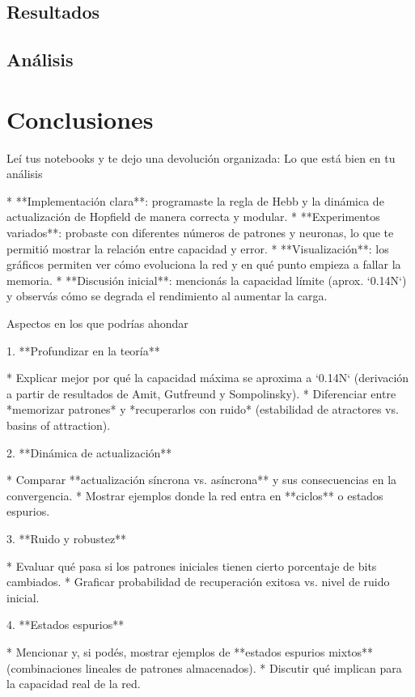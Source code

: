 \documentclass[11pt]{article} %
\begin{document}
\subsection{Resultados}

\subsection{Análisis}

\section{Conclusiones}

Leí tus notebooks y te dejo una devolución organizada:
Lo que está bien en tu análisis

* **Implementación clara**: programaste la regla de Hebb y la dinámica de actualización de Hopfield de manera correcta y modular.
* **Experimentos variados**: probaste con diferentes números de patrones y neuronas, lo que te permitió mostrar la relación entre capacidad y error.
* **Visualización**: los gráficos permiten ver cómo evoluciona la red y en qué punto empieza a fallar la memoria.
* **Discusión inicial**: mencionás la capacidad límite (aprox. `0.14N`) y observás cómo se degrada el rendimiento al aumentar la carga.

Aspectos en los que podrías ahondar

1. **Profundizar en la teoría**

   * Explicar mejor por qué la capacidad máxima se aproxima a `0.14N` (derivación a partir de resultados de Amit, Gutfreund y Sompolinsky).
   * Diferenciar entre *memorizar patrones* y *recuperarlos con ruido* (estabilidad de atractores vs. basins of attraction).

2. **Dinámica de actualización**

   * Comparar **actualización síncrona vs. asíncrona** y sus consecuencias en la convergencia.
   * Mostrar ejemplos donde la red entra en **ciclos** o estados espurios.

3. **Ruido y robustez**

   * Evaluar qué pasa si los patrones iniciales tienen cierto porcentaje de bits cambiados.
   * Graficar probabilidad de recuperación exitosa vs. nivel de ruido inicial.

4. **Estados espurios**

   * Mencionar y, si podés, mostrar ejemplos de **estados espurios mixtos** (combinaciones lineales de patrones almacenados).
   * Discutir qué implican para la capacidad real de la red.
\end{document}
